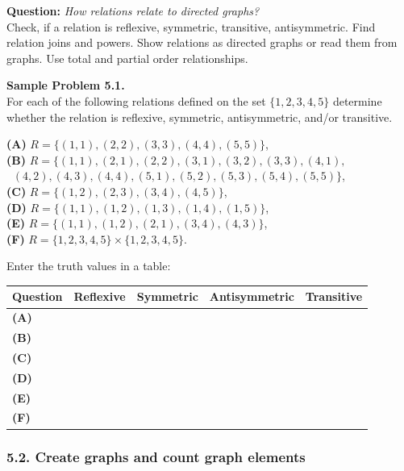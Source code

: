 \documentclass[jou]{apa6}
\begin{document}
{\bf Question:} {\em How relations relate to directed graphs?}\\
{\scriptsize
Check, if a relation is reflexive, symmetric, transitive, antisymmetric. Find relation joins and powers. Show relations as directed graphs or read them from graphs. Use total and partial order relationships.
}



\vspace{6pt}
{\bf Sample Problem 5.1.}\\
For each of the following relations defined on the set $\{ 1,2,3,4,5 \}$ determine whether
the relation is reflexive, symmetric, antisymmetric, and/or transitive. 


{\bf (A)} $R = \{ (1,1), (2,2), (3,3), (4,4), (5,5) \}$,\\
{\bf (B)} $R = \{ (1,1), (2,1), (2,2), (3,1), (3,2), (3,3), (4,1),$\\
\mbox{}$\;\;(4,2),(4,3), (4,4), (5,1), (5,2), (5,3), (5,4), (5,5) \}$,\\
{\bf (C)} $R = \{ (1,2), (2,3), (3,4), (4,5) \}$,\\
{\bf (D)} $R = \{ (1,1), (1,2), (1,3), (1,4), (1,5) \}$,\\
{\bf (E)} $R = \{ (1,1), (1,2), (2,1), (3,4), (4,3) \}$,\\
{\bf (F)} $R = \{ 1,2,3,4,5 \} \times \{ 1,2,3,4,5 \}$. 

Enter the truth values in a table: 

\begin{tabular}{|l|c|c|c|c|} \hline
{\scriptsize Question} & {\scriptsize Reflexive} & {\scriptsize Symmetric} & {\scriptsize Antisymmetric} & {\scriptsize Transitive} \\ \hline
{\bf (A)} & & & & \\ \hline
{\bf (B)} & & & & \\ \hline
{\bf (C)} & & & & \\ \hline
{\bf (D)} & & & & \\ \hline
{\bf (E)} & & & & \\ \hline
{\bf (F)} & & & & \\ \hline
\end{tabular}



\subsubsection{5.2. Create graphs and count graph elements}
\end{document}
